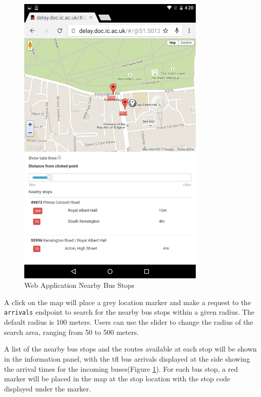\begin{figure}
\centering
\includegraphics[width=0.8\textwidth]{figures/clicked_view.png}
\caption{\label{fig:clicked_view} Web Application Nearby Bus Stops}
\end{figure}

\par A click on the map will place a grey location marker and make a request to the \texttt{arrivals} endpoint to search for the nearby bus stops within a given radius. The default radius is 100 meters. Users can use the slider to change the radius of the search area, ranging from 50 to 500 meters.

\par A list of the nearby bus stops and the routes available at each stop will be shown in the information panel, with the \acrshort{tfl} bus arrivals displayed at the side showing the arrival times for the incoming buses(Figure \ref{fig:clicked_view}). For each bus stop, a red marker will be placed in the map at the stop location with the stop code displayed under the marker.

